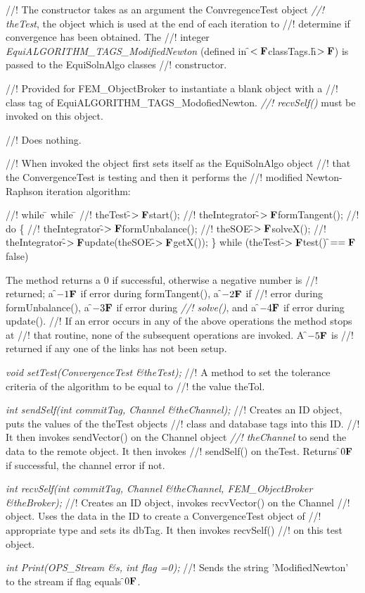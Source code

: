 //! The constructor takes as an argument the ConvregenceTest object {\em
//! theTest}, the object which is used at the end of each iteration to
//! determine if convergence has been obtained. The
//! integer {\em EquiALGORITHM\_TAGS\_ModifiedNewton} (defined in
\f$<{\bf F}$classTags.h\f$>{\bf F}$) is passed to the EquiSolnAlgo classes
//! constructor. 

//! Provided for FEM\_ObjectBroker to instantiate a blank object with a
//! class tag of EquiALGORITHM\_TAGS\_ModofiedNewton. {\em
//! recvSelf()} must be invoked on this object.

//! Does nothing.

//! When invoked the object first sets itself as the EquiSolnAlgo object
//! that the ConvergenceTest is testing and then it performs the
//! modified Newton-Raphson iteration algorithm: 
\begin{tabbing}
//! while \= \+ while \= \kill
//! theTest-\f$>{\bf F}$start();
//! theIntegrator-\f$>{\bf F}$formTangent();
//! do \{ \+
//! theIntegrator-\f$>{\bf F}$formUnbalance();
//! theSOE-\f$>{\bf F}$solveX();
//! theIntegrator-\f$>{\bf F}$update(theSOE-\f$>{\bf F}$getX()); \-
\} while (theTest-\f$>{\bf F}$test() \f$=={\bf F}$ false)\-
\end{tabbing}


\noindent The method returns a 0 if successful, otherwise a negative number is
//! returned; a \f$-1{\bf F}$ if error during formTangent(), a \f$-2{\bf F}$ if
//! error during formUnbalance(), a \f$-3{\bf F}$ if error during {\em
//! solve()}, and a \f$-4{\bf F}$ if error during update().
//! If an error occurs in any of the above operations the method stops at
//! that routine, none of the subsequent operations are invoked. A \f$-5{\bf F}$ is
//! returned if any one of the links has not been setup.

{\em void setTest(ConvergenceTest \&theTest);}
//! A method to set the tolerance criteria of the algorithm to be equal to
//! the value \p theTol.

{\em int sendSelf(int commitTag, Channel \&theChannel);}
//! Creates an ID object, puts the values of the \p theTest objects
//! class and database tags into this ID.
//! It then invokes sendVector() on the Channel object {\em
//! theChannel} to send the data to the remote object. It then invokes
//! sendSelf() on \p theTest. Returns \f$0{\bf F}$ if successful, the
 channel error if not.

{\em int recvSelf(int commitTag, Channel \&theChannel, FEM\_ObjectBroker
\&theBroker);} 
//! Creates an ID object, invokes recvVector() on the Channel
//! object. Uses the data in the ID to create a ConvergenceTest object of
//! appropriate type and sets its dbTag. It then invokes recvSelf()
//! on this test object.

{\em int Print(OPS\_Stream \&s, int flag =0);}
//! Sends the string 'ModifiedNewton' to the stream if \p flag equals \f$0{\bf F}$.
